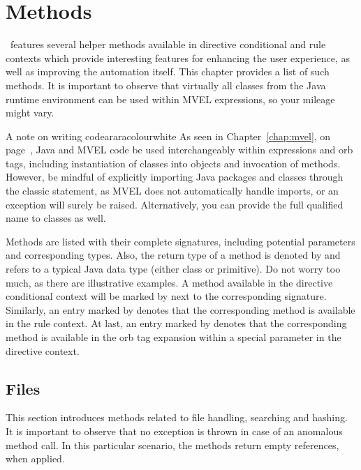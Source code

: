 \chapter{Methods}
\label{chap:methods}

\arara\ features several helper methods available in directive conditional and rule contexts which provide interesting features for enhancing the user experience, as well as improving the automation itself. This chapter provides a list of such methods. It is important to observe that virtually all classes from the Java runtime environment can be used within MVEL expressions, so your mileage might vary.

\begin{messagebox}{A note on writing code}{araracolour}{\icok}{white}
As seen in Chapter~\ref{chap:mvel}, on page~\pageref{chap:mvel}, Java and MVEL code be used interchangeably within expressions and orb tags, including instantiation of classes into objects and invocation of methods. However, be mindful of explicitly importing Java packages and classes through the classic  statement, as MVEL does not automatically handle imports, or an exception will surely be raised. Alternatively, you can provide the full qualified name to classes as well.
\end{messagebox}

Methods are listed with their complete signatures, including potential  parameters and corresponding types. Also, the return type of a method is denoted by  and refers to a typical Java data type (either class or primitive). Do not worry too much, as there are illustrative examples. A method available in the directive conditional context will be marked by  next to the corresponding signature. Similarly, an entry marked by  denotes that the corresponding method is available in the rule context. At last, an entry marked by  denotes that the corresponding method is available in the orb tag expansion within a special  parameter in the directive context.

\section{Files}
\label{sec:files}

This section introduces methods related to file handling, searching and hashing. It is important to observe that no exception is thrown in case of an anomalous method call. In this particular scenario, the methods return empty references, when applied.

